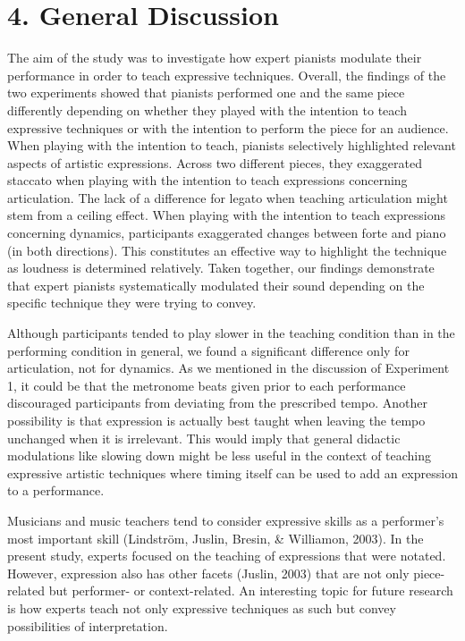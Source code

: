 \documentclass[
  english,
  man,floatsintext]{apa6}
\begin{document}
\newpage

\hypertarget{general-discussion}{%
\section{4. General Discussion}\label{general-discussion}}

The aim of the study was to investigate how expert pianists modulate their performance in order to teach expressive techniques. Overall, the findings of the two experiments showed that pianists performed one and the same piece differently depending on whether they played with the intention to teach expressive techniques or with the intention to perform the piece for an audience. When playing with the intention to teach, pianists selectively highlighted relevant aspects of artistic expressions. Across two different pieces, they exaggerated staccato when playing with the intention to teach expressions concerning articulation. The lack of a difference for legato when teaching articulation might stem from a ceiling effect. When playing with the intention to teach expressions concerning dynamics, participants exaggerated changes between forte and piano (in both directions). This constitutes an effective way to highlight the technique as loudness is determined relatively. Taken together, our findings demonstrate that expert pianists systematically modulated their sound depending on the specific technique they were trying to convey.

Although participants tended to play slower in the teaching condition than in the performing condition in general, we found a significant difference only for articulation, not for dynamics. As we mentioned in the discussion of Experiment 1, it could be that the metronome beats given prior to each performance discouraged participants from deviating from the prescribed tempo. Another possibility is that expression is actually best taught when leaving the tempo unchanged when it is irrelevant. This would imply that general didactic modulations like slowing down might be less useful in the context of teaching expressive artistic techniques where timing itself can be used to add an expression to a performance.

Musicians and music teachers tend to consider expressive skills as a performer's most important skill (Lindström, Juslin, Bresin, \& Williamon, 2003). In the present study, experts focused on the teaching of expressions that were notated. However, expression also has other facets (Juslin, 2003) that are not only piece-related but performer- or context-related. An interesting topic for future research is how experts teach not only expressive techniques as such but convey possibilities of interpretation.
\end{document}
